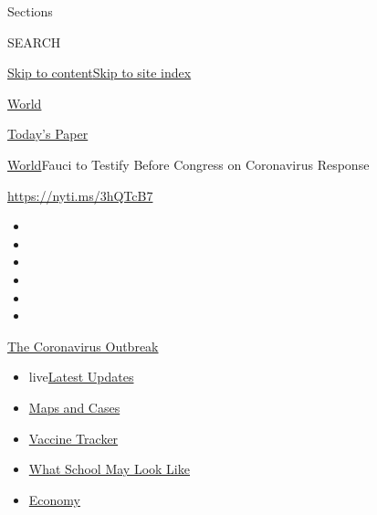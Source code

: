 Sections

SEARCH

\protect\hyperlink{site-content}{Skip to
content}\protect\hyperlink{site-index}{Skip to site index}

\href{https://www.nytimes.com/section/world}{World}

\href{https://myaccount.nytimes.com/auth/login?response_type=cookie\&client_id=vi}{}

\href{https://www.nytimes.com/section/todayspaper}{Today's Paper}

\href{/section/world}{World}\textbar{}Fauci to Testify Before Congress
on Coronavirus Response

\url{https://nyti.ms/3hQTcB7}

\begin{itemize}
\item
\item
\item
\item
\item
\item
\end{itemize}

\href{https://www.nytimes.com/news-event/coronavirus?action=click\&pgtype=Article\&state=default\&region=TOP_BANNER\&context=storylines_menu}{The
Coronavirus Outbreak}

\begin{itemize}
\tightlist
\item
  live\href{https://www.nytimes.com/2020/08/01/world/coronavirus-covid-19.html?action=click\&pgtype=Article\&state=default\&region=TOP_BANNER\&context=storylines_menu}{Latest
  Updates}
\item
  \href{https://www.nytimes.com/interactive/2020/us/coronavirus-us-cases.html?action=click\&pgtype=Article\&state=default\&region=TOP_BANNER\&context=storylines_menu}{Maps
  and Cases}
\item
  \href{https://www.nytimes.com/interactive/2020/science/coronavirus-vaccine-tracker.html?action=click\&pgtype=Article\&state=default\&region=TOP_BANNER\&context=storylines_menu}{Vaccine
  Tracker}
\item
  \href{https://www.nytimes.com/interactive/2020/07/29/us/schools-reopening-coronavirus.html?action=click\&pgtype=Article\&state=default\&region=TOP_BANNER\&context=storylines_menu}{What
  School May Look Like}
\item
  \href{https://www.nytimes.com/live/2020/07/31/business/stock-market-today-coronavirus?action=click\&pgtype=Article\&state=default\&region=TOP_BANNER\&context=storylines_menu}{Economy}
\end{itemize}

